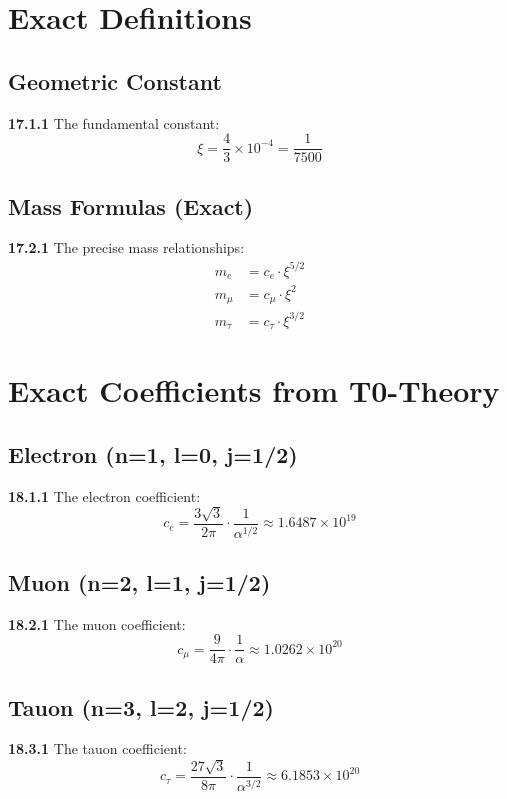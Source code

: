 \documentclass[12pt,a4paper]{article}
\begin{document}
\section{Exact Definitions}

\subsection{Geometric Constant}
\noindent \textbf{17.1.1} The fundamental constant:
\begin{equation}
	\xi = \frac{4}{3} \times 10^{-4} = \frac{1}{7500}
\end{equation}

\subsection{Mass Formulas (Exact)}
\noindent \textbf{17.2.1} The precise mass relationships:
\begin{align}
	m_e &= c_e \cdot \xi^{5/2} \\
	m_\mu &= c_\mu \cdot \xi^2 \\
	m_\tau &= c_\tau \cdot \xi^{3/2}
\end{align}

\section{Exact Coefficients from T0-Theory}

\subsection{Electron (n=1, l=0, j=1/2)}
\noindent \textbf{18.1.1} The electron coefficient:
\begin{equation}
	c_e = \frac{3\sqrt{3}}{2\pi} \cdot \frac{1}{\alpha^{1/2}} \approx 1.6487 \times 10^{19}
\end{equation}

\subsection{Muon (n=2, l=1, j=1/2)}
\noindent \textbf{18.2.1} The muon coefficient:
\begin{equation}
	c_\mu = \frac{9}{4\pi} \cdot \frac{1}{\alpha} \approx 1.0262 \times 10^{20}
\end{equation}

\subsection{Tauon (n=3, l=2, j=1/2)}
\noindent \textbf{18.3.1} The tauon coefficient:
\begin{equation}
	c_\tau = \frac{27\sqrt{3}}{8\pi} \cdot \frac{1}{\alpha^{3/2}} \approx 6.1853 \times 10^{20}
\end{equation}
\end{document}
